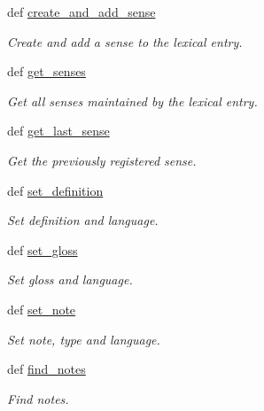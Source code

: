 \begin{DoxyCompactItemize}
def \hyperlink{classlmf_1_1src_1_1core_1_1lexical__entry_1_1_lexical_entry_a6a3c981f673e000f25b0be3df42b53f2}{create\+\_\+and\+\_\+add\+\_\+sense}
\begin{DoxyCompactList}\small\item\em Create and add a sense to the lexical entry. \end{DoxyCompactList}\item 
def \hyperlink{classlmf_1_1src_1_1core_1_1lexical__entry_1_1_lexical_entry_a00e6fd296669f34f047b3502bebd6a90}{get\+\_\+senses}
\begin{DoxyCompactList}\small\item\em Get all senses maintained by the lexical entry. \end{DoxyCompactList}\item 
def \hyperlink{classlmf_1_1src_1_1core_1_1lexical__entry_1_1_lexical_entry_a50334b78f54e0ad7a2bedbc7d5bf821f}{get\+\_\+last\+\_\+sense}
\begin{DoxyCompactList}\small\item\em Get the previously registered sense. \end{DoxyCompactList}\item 
def \hyperlink{classlmf_1_1src_1_1core_1_1lexical__entry_1_1_lexical_entry_aaf135ff72cc9f20358208e733c3a0ffb}{set\+\_\+definition}
\begin{DoxyCompactList}\small\item\em Set definition and language. \end{DoxyCompactList}\item 
def \hyperlink{classlmf_1_1src_1_1core_1_1lexical__entry_1_1_lexical_entry_ab83d1cb6142baa7a1914db467f63121f}{set\+\_\+gloss}
\begin{DoxyCompactList}\small\item\em Set gloss and language. \end{DoxyCompactList}\item 
def \hyperlink{classlmf_1_1src_1_1core_1_1lexical__entry_1_1_lexical_entry_a5efc30f6a6e8bb9b761ece95523719df}{set\+\_\+note}
\begin{DoxyCompactList}\small\item\em Set note, type and language. \end{DoxyCompactList}\item 
def \hyperlink{classlmf_1_1src_1_1core_1_1lexical__entry_1_1_lexical_entry_afd1942b2ace38b2e6522c9b1c55a17f3}{find\+\_\+notes}
\begin{DoxyCompactList}\small\item\em Find notes. \end{DoxyCompactList}\item 

\end{DoxyCompactItemize}
